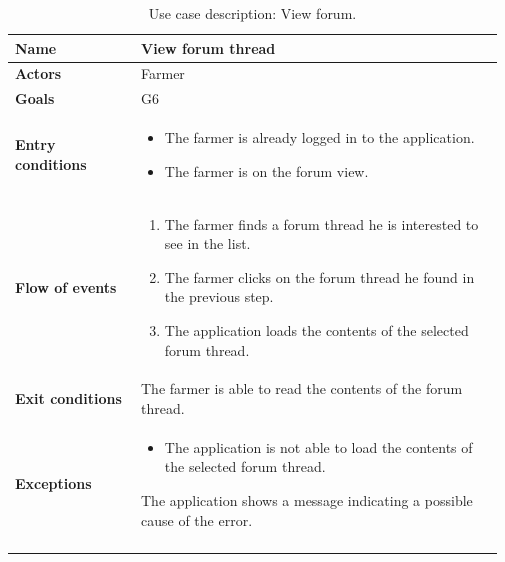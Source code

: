 \begin{longtable}{@{}p{0.25\linewidth} p{0.72\linewidth}@{}}
    \toprule
	\textbf{Name}               & View forum thread\\
	\midrule
	\textbf{Actors}             & Farmer\\
	\midrule
	\textbf{Goals}              & G6 \\
	\midrule
	
	\textbf{Entry conditions}   & \begin{itemize}[leftmargin=.4cm,noitemsep,topsep=0pt,before=\vspace{-3mm},after=\vspace{-4mm}]
	    \item The farmer is already logged in to the application.
	    \item The farmer is on the forum view.
	\end{itemize}\\
	\midrule
	
	\textbf{Flow of events}     & \begin{enumerate}[leftmargin=.4cm,noitemsep,topsep=0pt,before=\vspace{-3mm},after=\vspace{-4mm}]
	    \item The farmer finds a forum thread he is interested to see in the list.
	    \item The farmer clicks on the forum thread he found in the previous step.
	    \item The application loads the contents of the selected forum thread.
	\end{enumerate}\\
	\midrule
	\textbf{Exit conditions}    &  The farmer is able to read the contents of the forum thread. \\
	\midrule
	
	\textbf{Exceptions}         & 
    \begin{itemize}[leftmargin=.4cm,noitemsep,topsep=0pt,before=\vspace{-3mm}]
	   \item The application is not able to load the contents of the selected forum thread.
	\end{itemize}
	The application shows a message indicating a possible cause of the error.
	\\\bottomrule
	\caption{Use case description: View forum.} 
\end{longtable}

